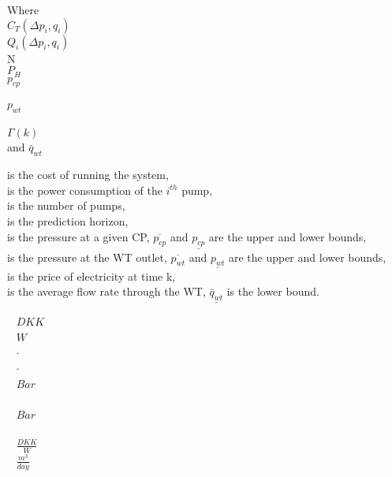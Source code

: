  \begin{minipage}[t]{0.20\textwidth}
 Where\\
 \hspace*{8mm} $C_T(\Delta{p}_i,q_i)$ \\
 \hspace*{8mm} $Q_i(\Delta{p}_i,q_i)$ \\
 \hspace*{8mm} N \\
 \hspace*{8mm} $P_H$ \\
 \hspace*{8mm} $p_{cp}$ \\
 \hspace*{8mm}  \textcolor{White}{te}\\
 \hspace*{8mm} $p_{wt}$ \\
 \hspace*{8mm}  \textcolor{White}{te}\\
 \hspace*{8mm} $\Gamma(k)$ \\
  and \hspace*{0.7mm} $\bar{q}_{wt}$	
 \end{minipage}
 \begin{minipage}[t]{0.68\textwidth}
 \vspace*{2mm}
 is the cost of running the system, \\
 is the power consumption of the $i^{th}$ pump,\\
 is the number of pumps,\\
 is the prediction horizon,\\
 is the pressure at a given CP, $\overline{p_{cp}}$ and $\underline{p_{cp}}$ are the upper and lower bounds,\\
 is the pressure at the WT outlet, $\overline{p_{wt}}$ and $\underline{p_{wt}}$ are the upper and lower bounds,\\
 is the price of electricity at time k,\\ 
 is the average flow rate through the WT, $\underline{\bar{q}_{wt}}$ is the lower bound.
 \end{minipage}
 \begin{minipage}[t]{0.10\textwidth}
 \vspace*{2mm}
 \textcolor{White}{te}$\unit{DKK}$\\
 \textcolor{White}{te}$\unit{W}$\\
 \textcolor{White}{te}$\unit{\cdot}$\\
 \textcolor{White}{te}$\unit{\cdot}$\\
 \textcolor{White}{te}$\unit{Bar}$\\
 \hspace*{8mm}  \textcolor{White}{te}\\
 \textcolor{White}{te}$\unit{Bar}$\\
 \hspace*{8mm}  \textcolor{White}{te}\\
 \textcolor{White}{te}$\unit{\frac{DKK}{W}}$\\
  \textcolor{White}{te}$\unit{\frac{m^3}{day}}$
 \end{minipage}


